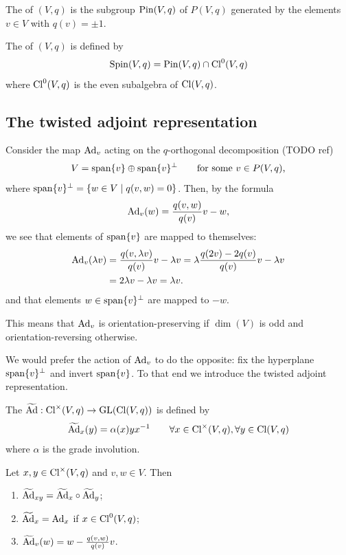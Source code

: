 \begin{definition}
The  of $(V,q)$ is the subgroup $\operatorname{Pin}(V,q)$ of $P(V,q)$ generated by the elements $v\in V$ with $q(v) = \pm 1$.

The  of $(V,q)$ is defined by
\[ \operatorname{Spin}(V,q) = \operatorname{Pin}(V,q) \cap \operatorname{Cl}^0(V,q) \]
where $\operatorname{Cl}^0(V,q)$ is the even subalgebra of $\operatorname{Cl}(V,q)$.
\end{definition}

\subsection{The twisted adjoint representation}
Consider the map $\operatorname{Ad}_v$ acting on the $q$-orthogonal decomposition (TODO ref)
\[ V = \operatorname{span}\{v\}\oplus\operatorname{span}\{v\}^\perp \qquad \text{for some $v\in P(V,q)$,} \]
where $\Span\{v\}^\perp = \setbuilder{w\in V}{q(v,w)=0}$. Then, by the formula
\[ \operatorname{Ad}_v(w) = \frac{q(v,w)}{q(v)}v - w ,\]
we see that elements of $\operatorname{span}\{v\}$ are mapped to themselves:
\begin{align*}
\operatorname{Ad}_v(\lambda v) &= \frac{q(v,\lambda v)}{q(v)}v - \lambda v = \lambda\frac{q(2v)-2q(v)}{q(v)}v - \lambda v \\
&= 2\lambda v -\lambda v = \lambda v.
\end{align*}
and that elements $w\in\operatorname{span}\{v\}^\perp$ are mapped to $-w$.

This means that $\operatorname{Ad}_v$ is orientation-preserving if $\dim(V)$ is odd and orientation-reversing otherwise.

We would prefer the action of $\operatorname{Ad}_v$ to do the opposite: fix the hyperplane $\operatorname{span}\{v\}^\perp$ and invert $\operatorname{span}\{v\}$. To that end we introduce the twisted adjoint representation.
\begin{definition}
The  $\widetilde{\operatorname{Ad}}: \operatorname{Cl}^\times(V,q) \to \operatorname{GL}(\operatorname{Cl}(V,q))$ is defined by
\[ \widetilde{\operatorname{Ad}}_x(y) = \alpha(x)yx^{-1} \qquad \forall x\in \operatorname{Cl}^\times(V,q), \forall y\in \operatorname{Cl}(V,q) \]
where $\alpha$ is the grade involution.
\end{definition}
\begin{lemma}
Let $x,y\in \operatorname{Cl}^\times(V,q)$ and $v,w\in V$. Then
\begin{enumerate}
\item $\widetilde{\operatorname{Ad}}_{xy} = \widetilde{\operatorname{Ad}}_x\circ \widetilde{\operatorname{Ad}}_y$;
\item $\widetilde{\operatorname{Ad}}_x = \operatorname{Ad}_x$ if $x\in \operatorname{Cl}^0(V,q)$;
\item $\widetilde{\operatorname{Ad}}_v(w) = w-\frac{q(v,w)}{q(v)}v$.
\end{enumerate}
\end{lemma}

